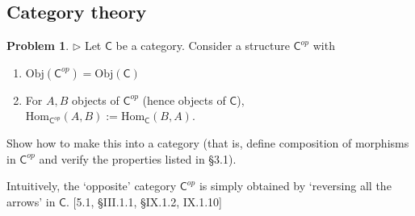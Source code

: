 \documentclass[fontsize=14pt]{scrartcl}
\theoremstyle{definition}
\newtheorem{problem-internal}{Problem}[subsection]
\newenvironment{problem}{
  \medskip
  \begin{problem-internal}
}{
  \end{problem-internal}
}
\newcommand{\Obj}{\mathrm{Obj}}
\newcommand{\Hom}{\mathrm{Hom}}
\begin{document}
\subsection{Category theory}


\begin{problem}
$\rhd$ Let $\mathsf{C}$ be a category. Consider a structure
$\mathsf{C}^{op}$ with
\begin{enumerate}
\item $\Obj(\mathsf{C}^{op}) = \Obj(\mathsf{C})$
\item For $A, B$ objects of $\mathsf{C}^{op}$ (hence objects of $\mathsf{C}$),
$\Hom_{\mathsf{C}^{op}}(A, B) := \Hom_{\mathsf{C}}(B, A)$.
\end{enumerate}
Show how to make this into a category (that is, define composition of morphisms
in $\mathsf{C}^{op}$ and verify the properties listed in \S3.1).

Intuitively, the `opposite' category $\mathsf{C}^{op}$ is simply obtained by
`reversing all the arrows' in $\mathsf{C}$. [5.1, \S III.1.1, \S IX.1.2,
IX.1.10]
\end{problem}
\end{document}

